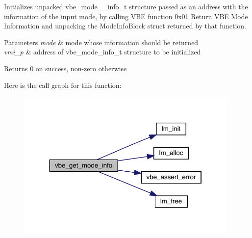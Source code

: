 Initializes unpacked vbe\+\_\+mode\+\_\+\+\_\+info\+\_\+t structure passed as an address with the information of the input mode, by calling V\+BE function 0x01 Return V\+BE Mode Information and unpacking the Mode\+Info\+Block struct returned by that function.


\begin{DoxyParams}{Parameters}
{\em mode} & mode whose information should be returned \\
\hline
{\em vmi\+\_\+p} & address of vbe\+\_\+mode\+\_\+info\+\_\+t structure to be initialized \\
\hline
\end{DoxyParams}
\begin{DoxyReturn}{Returns}
0 on success, non-\/zero otherwise 
\end{DoxyReturn}
Here is the call graph for this function\+:\nopagebreak
\begin{figure}[H]
\begin{center}
\leavevmode
\includegraphics[width=311pt]{group__vbe_ga4ef3234e41f2050bc094a22049b69e45_cgraph}
\end{center}
\end{figure}
